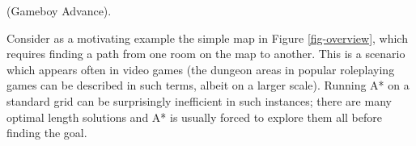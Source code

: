 (Gameboy Advance). 
\par
Consider as a motivating example the simple map in Figure \ref{fig-overview}, which
requires finding a path from one room on the map to another. 
This is a scenario which appears often in video games (the dungeon areas in popular roleplaying games
can be described in such terms, albeit on a larger scale).
Running A* on a standard grid can be surprisingly inefficient in such instances;
there are many optimal length solutions and
A* is usually forced to explore them all before finding the goal.

